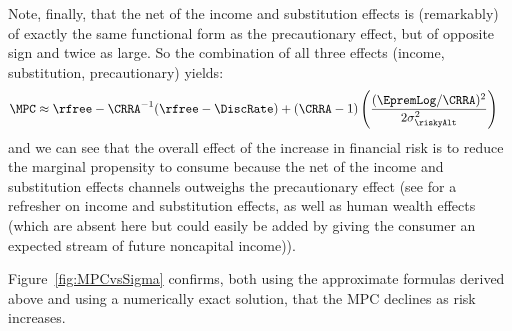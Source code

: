 {Note, finally, that the net of the income and substitution effects is (remarkably) of exactly the same functional
form as the precautionary effect, but of opposite sign and twice as large.  So the combination of all
three effects (income, substitution, precautionary) yields:
\begin{equation}\begin{gathered}\begin{aligned}
        \MPC & \approx  \rfree-\CRRA^{-1}(\rfree-\DiscRate)+ (\CRRA-1)\left(\frac{(\EpremLog/\CRRA)^{2}}{2 \sigma_{\riskyAlt}^{2}}\right)
\end{aligned}\end{gathered}\end{equation}
and we can see that the overall effect of the increase in financial
risk is to reduce the marginal propensity to consume because the net
of the income and substitution effects channels outweighs the precautionary effect (see
 for a refresher on income and
substitution effects, as well as human wealth effects (which are
absent here but could easily be added by giving the consumer an
expected stream of future noncapital income)).

Figure~\ref{fig:MPCvsSigma} confirms, both using the approximate formulas
derived above and using a numerically exact solution, that the MPC declines
as risk increases.

} %



